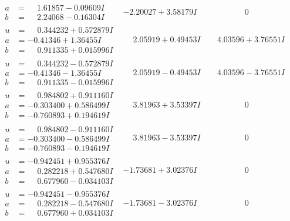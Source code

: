 \documentclass[1p]{elsarticle_modified}
\theoremstyle{definition}
\begin{document}
$$\begin{array}{c|c|c}
\begin{aligned}
a &= \phantom{-}1.61857 - 0.09609 I \\
b &= \phantom{-}2.24068 - 0.16304 I\end{aligned}
 & -2.20027 + 3.58179 I & \phantom{-0.000000 } 0 \\ \hline\begin{aligned}
u &= \phantom{-}0.344232 + 0.572879 I \\
a &= -0.41346 + 1.36455 I \\
b &= \phantom{-}0.911335 + 0.015996 I\end{aligned}
 & \phantom{-}2.05919 + 0.49453 I & \phantom{-}4.03596 + 3.76551 I \\ \hline\begin{aligned}
u &= \phantom{-}0.344232 - 0.572879 I \\
a &= -0.41346 - 1.36455 I \\
b &= \phantom{-}0.911335 - 0.015996 I\end{aligned}
 & \phantom{-}2.05919 - 0.49453 I & \phantom{-}4.03596 - 3.76551 I \\ \hline\begin{aligned}
u &= \phantom{-}0.984802 + 0.911160 I \\
a &= -0.303400 + 0.586499 I \\
b &= -0.760893 + 0.194619 I\end{aligned}
 & \phantom{-}3.81963 + 3.53397 I & \phantom{-0.000000 } 0 \\ \hline\begin{aligned}
u &= \phantom{-}0.984802 - 0.911160 I \\
a &= -0.303400 - 0.586499 I \\
b &= -0.760893 - 0.194619 I\end{aligned}
 & \phantom{-}3.81963 - 3.53397 I & \phantom{-0.000000 } 0 \\ \hline\begin{aligned}
u &= -0.942451 + 0.955376 I \\
a &= \phantom{-}0.282218 + 0.547680 I \\
b &= \phantom{-}0.677960 - 0.034103 I\end{aligned}
 & -1.73681 + 3.02376 I & \phantom{-0.000000 } 0 \\ \hline\begin{aligned}
u &= -0.942451 - 0.955376 I \\
a &= \phantom{-}0.282218 - 0.547680 I \\
b &= \phantom{-}0.677960 + 0.034103 I\end{aligned}
 & -1.73681 - 3.02376 I & \phantom{-0.000000 } 0 \\ \hline\begin{aligned}

\end{aligned}
\end{array}$$
\end{document}
